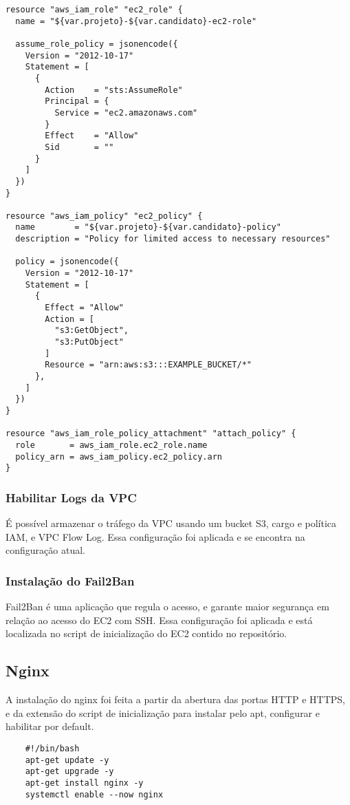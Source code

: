 \documentclass{article}
\begin{document}
\begin{verbatim}
resource "aws_iam_role" "ec2_role" {
  name = "${var.projeto}-${var.candidato}-ec2-role"

  assume_role_policy = jsonencode({
    Version = "2012-10-17"
    Statement = [
      {
        Action    = "sts:AssumeRole"
        Principal = {
          Service = "ec2.amazonaws.com"
        }
        Effect    = "Allow"
        Sid       = ""
      }
    ]
  })
}

resource "aws_iam_policy" "ec2_policy" {
  name        = "${var.projeto}-${var.candidato}-policy"
  description = "Policy for limited access to necessary resources"

  policy = jsonencode({
    Version = "2012-10-17"
    Statement = [
      {
        Effect = "Allow"
        Action = [
          "s3:GetObject",
          "s3:PutObject"
        ]
        Resource = "arn:aws:s3:::EXAMPLE_BUCKET/*"
      },
    ]
  })
}

resource "aws_iam_role_policy_attachment" "attach_policy" {
  role       = aws_iam_role.ec2_role.name
  policy_arn = aws_iam_policy.ec2_policy.arn
}
\end{verbatim}

\subsubsection{Habilitar Logs da VPC}
É possível armazenar o tráfego da VPC usando um bucket S3, cargo e política IAM, e VPC Flow Log. Essa configuração foi aplicada e se encontra na configuração atual.

\subsubsection{Instalação do Fail2Ban}
Fail2Ban é uma aplicação que regula o acesso, e garante maior segurança em relação ao acesso do EC2 com SSH. Essa configuração foi aplicada e está localizada no script de inicialização do EC2 contido no repositório.

\subsection{Nginx}
A instalação do nginx foi feita a partir da abertura das portas HTTP e HTTPS, e da extensão do script de inicialização para instalar pelo apt, configurar e habilitar por default.

\begin{verbatim}
    #!/bin/bash
    apt-get update -y
    apt-get upgrade -y
    apt-get install nginx -y
    systemctl enable --now nginx
\end{verbatim}
\end{document}
